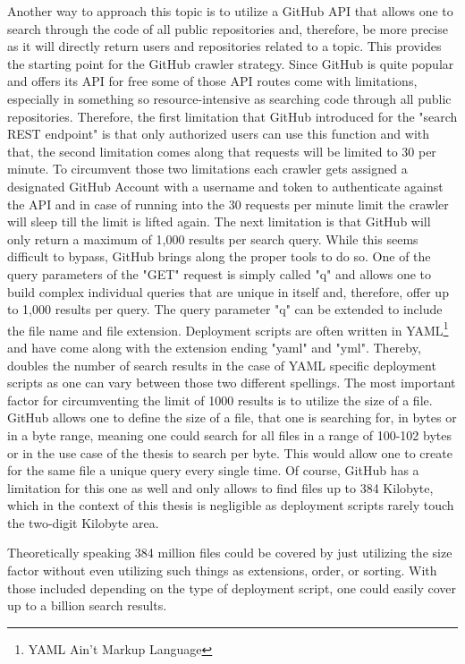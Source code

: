 Another way to approach this topic is to utilize a GitHub API that allows one to search through the code of all public repositories and, therefore, be more precise as it will directly return users and repositories related to a topic. This provides the starting point for the GitHub crawler strategy. Since GitHub is quite popular and offers its API for free some of those API routes come with limitations, especially in something so resource-intensive as searching code through all public repositories.
Therefore, the first limitation that GitHub introduced for the "search REST endpoint" is that only authorized users can use this function and with that, the second limitation comes along that requests will be limited to 30 per minute. To circumvent those two limitations each crawler gets assigned a designated GitHub Account with a username and token to authenticate against the API and in case of running into the 30 requests per minute limit the crawler will sleep till the limit is lifted again.
The next limitation is that GitHub will only return a maximum of 1,000 results per search query. While this seems difficult to bypass, GitHub brings along the proper tools to do so. One of the query parameters of the "GET" request is simply called "q" and allows one to build complex individual queries that are unique in itself and, therefore, offer up to 1,000 results per query. The query parameter "q" can be extended to include the file name and file extension. Deployment scripts are often written in YAML\footnote{YAML Ain't Markup Language} and have come along with the extension ending "yaml" and "yml". Thereby, doubles the number of search results in the case of YAML specific deployment scripts as one can vary between those two different spellings. The most important factor for circumventing the limit of 1000 results is to utilize the size of a file. GitHub allows one to define the size of a file, that one is searching for, in bytes or in a byte range, meaning one could search for all files in a range of 100-102 bytes or in the use case of the thesis to search per byte. This would allow one to create for the same file a unique query every single time.
Of course, GitHub has a limitation for this one as well and only allows to find files up to 384 Kilobyte, which in the context of this thesis is negligible as deployment scripts rarely touch the two-digit Kilobyte area.

Theoretically speaking 384 million files could be covered by just utilizing the size factor without even utilizing such things as extensions, order, or sorting. With those included depending on the type of deployment script, one could easily cover up to a billion search results.

